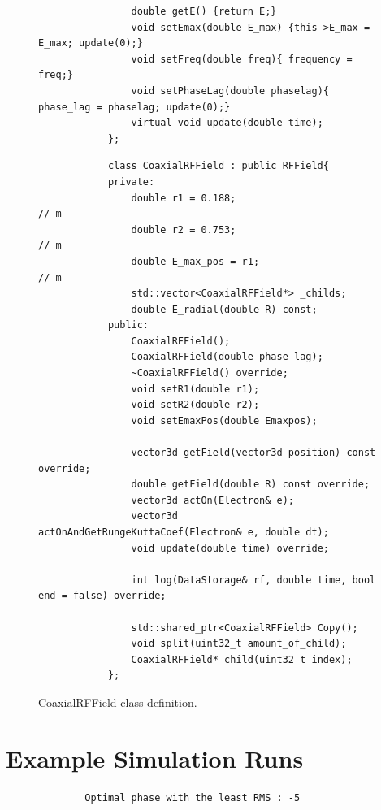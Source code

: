 \documentclass[a4paper,oneside,12pt]{report}
\numberwithin{equation}{chapter}
\begin{document}
{\begin{figure}[H]
\begin{minipage}{\textwidth}
\begin{verbatim}
                double getE() {return E;}
                void setEmax(double E_max) {this->E_max = E_max; update(0);}
                void setFreq(double freq){ frequency = freq;}
                void setPhaseLag(double phaselag){ phase_lag = phaselag; update(0);}
                virtual void update(double time);
            };
        \end{verbatim}
    \end{minipage}
    \vspace{10pt}
    \begin{minipage}{\textwidth}
        \begin{verbatim}
            class CoaxialRFField : public RFField{
            private:
                double r1 = 0.188;                         // m
                double r2 = 0.753;                         // m
                double E_max_pos = r1;                     // m
                std::vector<CoaxialRFField*> _childs;
                double E_radial(double R) const;
            public:
                CoaxialRFField();
                CoaxialRFField(double phase_lag);
                ~CoaxialRFField() override;
                void setR1(double r1);
                void setR2(double r2);
                void setEmaxPos(double Emaxpos);   

                vector3d getField(vector3d position) const override;
                double getField(double R) const override;
                vector3d actOn(Electron& e);
                vector3d actOnAndGetRungeKuttaCoef(Electron& e, double dt);    
                void update(double time) override; 

                int log(DataStorage& rf, double time, bool end = false) override;

                std::shared_ptr<CoaxialRFField> Copy();
                void split(uint32_t amount_of_child);
                CoaxialRFField* child(uint32_t index);
            };
        \end{verbatim}
    \end{minipage}

    \vspace{5pt}
    \caption{CoaxialRFField class definition.}
    \label{fig:rf_class}
\end{figure}

\chapter{Example Simulation Runs} \label{appendix:example_simulation_runs}
\vspace{30pt}
\begin{figure}[H]
    \centering
    \begin{verbatim}
        Optimal phase with the least RMS : -5


\end{verbatim}
\end{figure}}
\end{document}
